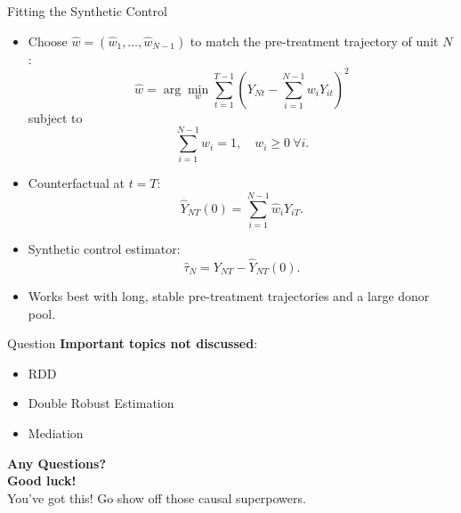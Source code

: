 \documentclass[10pt]{beamer}
\theoremstyle{plain}
\begin{document}

\begin{frame}{Fitting the Synthetic Control}
  \begin{itemize}
    \item Choose $\hat w = (\hat w_1,\dots,\hat w_{N-1})$ to match the pre-treatment trajectory of unit $N$:
    \[
      \hat w = \arg\min_{w}
      \sum_{t=1}^{T-1}
      \left(
        Y_{Nt} - \sum_{i=1}^{N-1} w_i Y_{it}
      \right)^2
    \]
    subject to
    \[
      \sum_{i=1}^{N-1} w_i = 1, \quad w_i \ge 0 \ \forall i.
    \]
    \pause
    \item Counterfactual at $t = T$:
    \[
      \widehat Y_{NT}(0) = \sum_{i=1}^{N-1} \hat w_i Y_{iT}.
    \]
    \pause
    \item Synthetic control estimator:
    \[
      \hat\tau_N = Y_{NT} - \widehat Y_{NT}(0).
    \]
    \pause
    \item Works best with long, stable pre-treatment trajectories and a large donor pool.
  \end{itemize}
\end{frame}


\begin{frame}{Question}
\textbf{Important topics not discussed}:
\begin{itemize}
    \item RDD
    \item Double Robust Estimation
    \item Mediation
\end{itemize}
\vspace{1em}
 \centering
  {\Large \textbf{Any Questions?}}\\[1em]
  {\Large \textbf{Good luck!}}\\[1em]
  {\Large You’ve got this! Go show off those causal superpowers.}
\end{frame}
\end{document}
